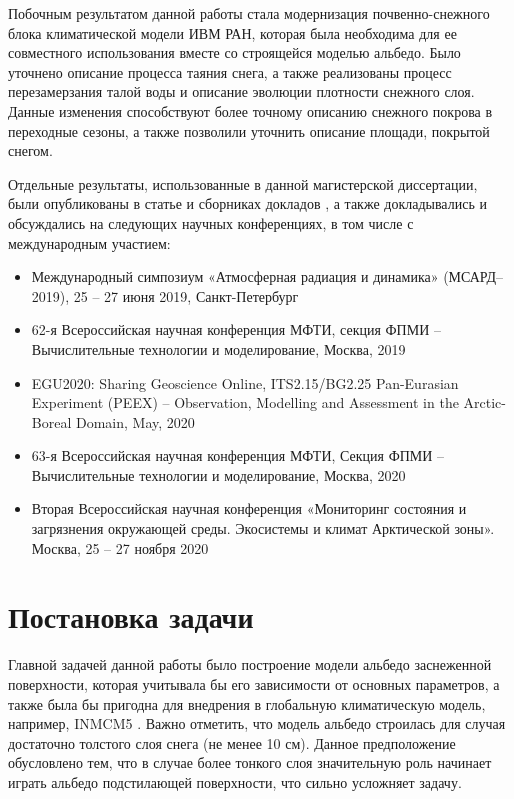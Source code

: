 \documentclass[a4paper, fontsize=14pt]{scrartcl}
\begin{document}
Побочным результатом данной работы стала модернизация почвенно-снежного блока климатической модели ИВМ РАН, которая была необходима для ее совместного использования вместе со строящейся моделью альбедо. Было уточнено описание процесса таяния снега, а также реализованы процесс перезамерзания талой воды и описание эволюции плотности снежного слоя. Данные изменения способствуют более точному описанию снежного покрова в переходные сезоны, а также позволили уточнить описание площади, покрытой снегом. \sloppy 

Отдельные результаты, использованные в данной магистерской диссертации, были опубликованы в статье \cite{Chernenkov2021rus} и сборниках докладов \cite{MSARD2019, mipt2019, EGU2020poster, EGU2020, mipt2020, Arctic2020}, а также докладывались и обсуждались на следующих научных конференциях, в том числе с международным участием:

\begin{itemize}
    \item Международный симпозиум «Атмосферная радиация и динамика» (МСАРД–2019), 25 -- 27 июня 2019, Санкт-Петербург \cite{MSARD2019}
    \item 62-я Всероссийская научная конференция МФТИ, секция ФПМИ -- Вычислительные технологии и моделирование, Москва, 2019 \cite{mipt2019}
    \item EGU2020: Sharing Geoscience Online, ITS2.15/BG2.25 Pan-Eurasian Experiment (PEEX) -- Observation, Modelling and Assessment in the Arctic-Boreal Domain, May, 2020 \cite{EGU2020poster, EGU2020} \sloppy 
    \item 63-я Всероссийская научная конференция МФТИ, Секция ФПМИ -- Вычислительные технологии и моделирование, Москва, 2020 \cite{mipt2020}
    \item Вторая Всероссийская научная конференция «Мониторинг состояния и загрязнения окружающей среды. Экосистемы и климат Арктической зоны». Москва, 25 -- 27 ноября 2020 \cite{Arctic2020}
\end{itemize} \sloppy 



\newpage
\section{Постановка задачи}

Главной задачей данной работы было построение модели альбедо заснеженной поверхности, которая учитывала бы его зависимости от основных параметров, а также была бы пригодна для внедрения в глобальную климатическую модель, например, INMCM5 \cite{Volodin2017rus}. Важно отметить, что модель альбедо строилась для случая достаточно толстого слоя снега (не менее 10 см). Данное предположение обусловлено тем, что в случае более тонкого слоя значительную роль начинает играть альбедо подстилающей поверхности, что сильно усложняет задачу. 
\end{document}
